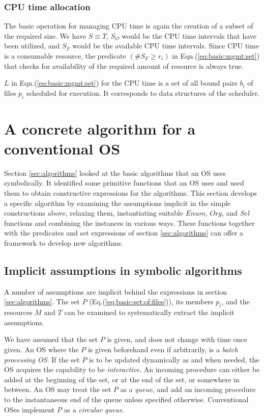 \documentclass[draft]{article}
\def\eqn#1{Eqn.(\ref{#1})}
\begin{document}
\subsubsection{CPU time allocation}
\label{sec:basic:cpu:time}

The basic operation  for managing CPU time is again  the creation of a
subset of the required size.  We have $S \equiv T$, $S_O$ would be the
CPU  time intervals that  have been  utilized, and  $S_F$ would  be the
available  CPU  time  intervals.   Since  CPU  time  is  a  consumable
resource,  the predicate  $(\#S_F \ge  r_i)$  in \eqn{eq:basic:mgmt:set}
that checks  for availability  of the required  amount of  resource is
always true.

$L$ in \eqn{eq:basic:mgmt:set} for the CPU  time is a set of all bound
pairs $b_i$ of files $p_i$ scheduled for execution.  It corresponds to
data structures of the scheduler.

\section{A concrete algorithm for a conventional OS}
\label{sec:algorithms:concrete}

Section \ref{sec:algorithms} looked at the basic algorithms that an OS
uses symbolically.  It identified  some primitive functions that an OS
uses  and  used  them  to  obtain  constructive  expressions  for  the
algorithms.  This  section develops a specific  algorithm by examining
the assumptions  implicit in the simple  constructions above, relaxing
them, instantiating  suitable $Enum$,  $Org$, and $Sel$  functions and
combining  the instances  in various  ways.  These  functions together
with    the    predicates    and    set   expressions    of    section
\ref{sec:algorithms} can offer a framework to develop new algorithms.

\subsection{Implicit assumptions in symbolic algorithms}
\label{sec:algorithms:concrete:assumptions}

A number of assumptions are implicit behind the expressions in section
\ref{sec:algorithms}.  The set $P$ (Eq.(\ref{eq:basic:set:of:files})),
its members  $p_i$, and the resources  $M$ and $T$ can  be examined to
systematically extract the implicit assumptions.

We have  assumed that the set $P$  is given, and does  not change with
time once  given.  An  OS where  the $P$ is  given beforehand  even if
arbitrarily, is a \emph{batch processing OS}.  If the set $P$ is to be
updated dynamically as and when needed, the OS acquires the capability
to be  \emph{interactive}.  An incoming procedure can  either be added
at the beginning of the set, or at the end of the set, or somewhere in
between.  An  OS may treat the set  $P$ as a \emph{queue},  and add an
incoming  procedure  to the  instantaneous  end  of  the queue  unless
specified   otherwise.    Conventional  OSes   implement   $P$  as   a
\emph{circular queue}.   
\end{document}
